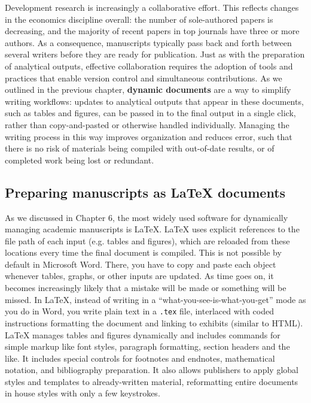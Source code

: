 Development research is increasingly a collaborative effort.
This reflects changes in the economics discipline overall:
the number of sole-authored papers is decreasing,
and the majority of recent papers in top journals have three or more
authors.
As a consequence, manuscripts typically pass back and forth between several writers
before they are ready for publication.
Just as with the preparation of analytical outputs,
effective collaboration requires the adoption of tools and practices
that enable version control and simultaneous contributions.
As we outlined in the previous chapter,
\textbf{dynamic documents} are a way to simplify writing workflows:
updates to analytical outputs that appear in these documents, such as tables and figures,
can be passed in to the final output in a single click,
rather than copy-and-pasted or otherwise handled individually.
Managing the writing process in this way
improves organization and reduces error,
such that there is no risk of materials being compiled
with out-of-date results, or of completed work being lost or redundant.

\subsection{Preparing manuscripts as {\LaTeX} documents}

As we discussed in Chapter 6, the most widely used software
for dynamically managing academic manuscripts is {\LaTeX}.
\index{\LaTeX}
{\LaTeX} uses explicit references to the file path of each input (e.g. tables and figures),
which are reloaded from these locations every time the final document is compiled.
This is not possible by default in Microsoft Word.
There, you have to copy and paste each object
whenever tables, graphs, or other inputs are updated.
As time goes on, it becomes increasingly likely
that a mistake will be made or something will be missed.
In {\LaTeX}, instead of writing in a
``what-you-see-is-what-you-get'' mode as you do in Word,
you write plain text in a \texttt{.tex} file,
interlaced with coded instructions formatting the document and linking to exhibits (similar to HTML).
{\LaTeX} manages tables and figures dynamically
and includes commands for simple markup
like font styles, paragraph formatting, section headers and the like.
It includes special controls for
footnotes and endnotes, mathematical notation, and bibliography preparation.
It also allows publishers to apply global styles and templates to already-written material,
reformatting entire documents in house styles with only a few keystrokes.

